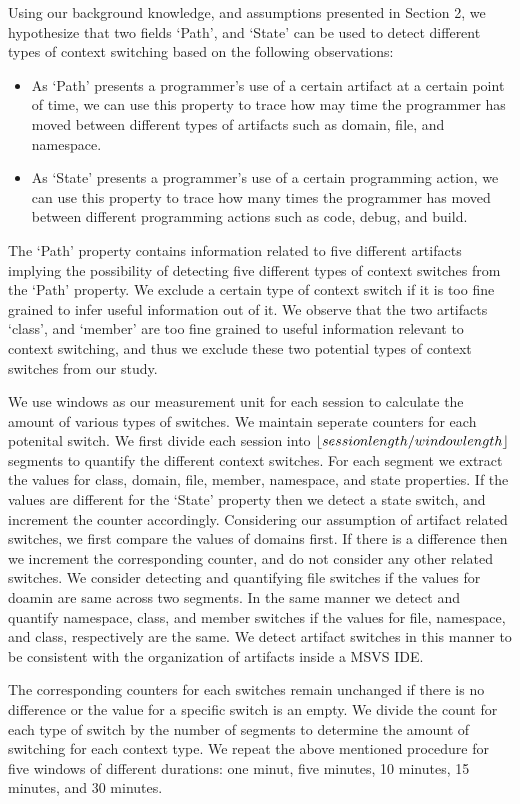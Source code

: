 Using our background knowledge, and assumptions presented in Section 2, we hypothesize that two fields `Path', and `State' can be used to detect different types of context switching based on the following observations: 
\begin{itemize}
\item{As `Path' presents a programmer's use of a certain artifact at a certain point of time, we can use this property to trace how may time the programmer has moved between different types of artifacts such as domain, file, and namespace.}
\item{As `State' presents a programmer's use of a certain programming action, we can 
use this property to trace how many times the programmer has moved between different programming actions such as code, debug, and build.}
\end{itemize}  
The `Path' property contains information related to five different artifacts implying the possibility of detecting five different types of context switches from the `Path' property. We exclude a certain type of context switch if it is too fine grained to infer useful information out of it. We observe that the two artifacts `class', and `member' are too fine grained to useful information relevant to context switching, and thus we exclude these two potential types of context switches from our study. 

We use windows as our measurement unit for each session to calculate the amount of various types of switches. We maintain seperate counters for each potenital switch. We first divide each session into $\lfloor session length / window length\rfloor$ segments to quantify the different context switches. For each segment we extract the values for class, domain, file, member, namespace, and state properties. 
If the values are different for the `State' property then we detect a state switch, and increment the counter accordingly. Considering our assumption of 
artifact related switches, we first compare the values of domains first. If there is a difference then we increment the corresponding counter, and do not consider any other related switches. We consider detecting and quantifying file switches if the values for doamin are same across two segments. In the same manner we detect and quantify namespace, class, and member switches if the values for file, namespace, and class, respectively are the same. We detect artifact switches in this manner to be consistent with the organization of artifacts inside a MSVS IDE.   
 
The corresponding counters for each switches remain unchanged if there is no difference or the value for a specific switch is an empty. We divide the count
for each type of switch by the number of segments to determine the amount of 
switching for each context type. We repeat the above mentioned procedure for five windows of different durations: one minut, five minutes, 10 minutes, 15 minutes, 
and 30 minutes.     

